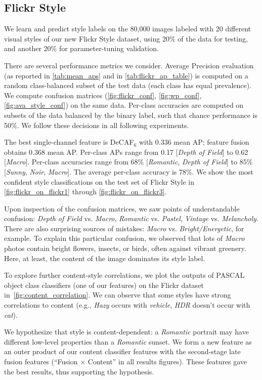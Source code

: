 \subsection{Flickr Style}
We learn and predict style labels on the 80,000 images labeled with 20 different visual styles of our new Flickr Style dataset, using 20\% of the data for testing, and another 20\% for parameter-tuning validation.

There are several performance metrics we consider.
Average Precision evaluation (as reported in \autoref{tab:mean_aps} and in \autoref{tab:flickr_ap_table}) is computed on a random class-balanced subset of the test data (each class has equal prevalence).
We compute confusion matrices (\autoref{fig:flickr_conf}, \autoref{fig:wp_conf}, \autoref{fig:ava_style_conf}) on the same data.
Per-class accuracies are computed on subsets of the data balanced by the binary label, such that chance performance is 50\%.
We follow these decisions in all following experiments.

The best single-channel feature is DeCAF$_6$ with 0.336 mean AP; feature fusion obtains 0.368 mean AP.
Per-class APs range from 0.17 [\emph{Depth of Field}] to  0.62 [\emph{Macro}].
Per-class accuracies range from 68\% [\emph{Romantic}, \emph{Depth of Field}] to 85\% [\emph{Sunny}, \emph{Noir}, \emph{Macro}].
The average per-class accuracy is 78\%.
We show the most confident style classifications on the test set of Flickr Style in \autoref{fig:flickr_on_flickr1} through \autoref{fig:flickr_on_flickr3}.

Upon inspection of the confusion matrices, we saw points of understandable confusion: \emph{Depth of Field} vs. \emph{Macro}, \emph{Romantic} vs. \emph{Pastel}, \emph{Vintage} vs. \emph{Melancholy}.
There are also surprising sources of mistakes: \emph{Macro} vs. \emph{Bright/Energetic}, for example.
To explain this particular confusion, we observed that lots of \emph{Macro} photos contain bright flowers, insects, or birds, often against vibrant greenery.
Here, at least, the content of the image dominates its style label.

To explore further content-style correlations, we plot the outputs of PASCAL object class classifiers (one of our features) on the Flickr dataset in~\autoref{fig:content_correlation}.
We can observe that some styles have strong correlations to content (e.g., \emph{Hazy} occurs with \emph{vehicle}, \emph{HDR} doesn't occur with \emph{cat}).

We hypothesize that style is content-dependent: a \emph{Romantic} portrait may have different low-level properties than a \emph{Romantic} sunset.
We form a new feature as an outer product of our content classifier features with the second-stage late fusion features (``Fusion $\times$ Content'' in all results figures).
These features gave the best results, thus supporting the hypothesis.

